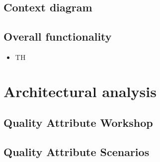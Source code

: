 \documentclass[10pt]{article}
\begin{document}
\subsection{Context diagram}


\subsection{Overall functionality}
\begin{itemize}
    \item TH
\end{itemize}
 

\section{Architectural analysis}

\subsection{Quality Attribute Workshop}

\subsection{Quality Attribute Scenarios}
\end{document}
